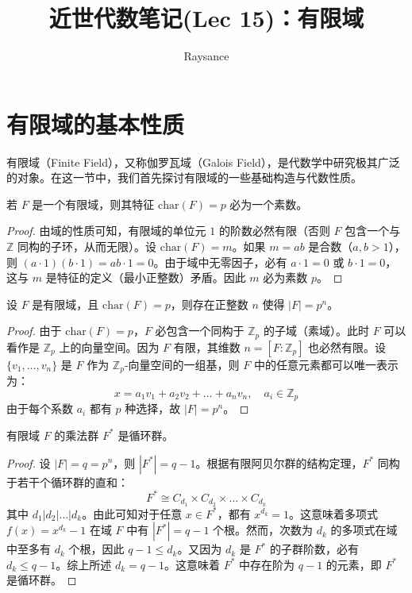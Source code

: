 \documentclass[11pt]{article}
\title{近世代数笔记(Lec 15)：有限域}
\author{Raysance}
\date{}
\begin{document}
\maketitle

\section{有限域的基本性质}

有限域（Finite Field），又称伽罗瓦域（Galois Field），是代数学中研究极其广泛的对象。在这一节中，我们首先探讨有限域的一些基础构造与代数性质。

\begin{cnproperty}
    若 $F$ 是一个有限域，则其特征 $\text{char}(F) = p$ 必为一个素数。
\end{cnproperty}
\begin{proof}
    由域的性质可知，有限域的单位元 $1$ 的阶数必然有限（否则 $F$ 包含一个与 $\mathbb{Z}$ 同构的子环，从而无限）。设 $\text{char}(F) = m$。如果 $m = ab$ 是合数（$a, b > 1$），则 $(a \cdot 1)(b \cdot 1) = ab \cdot 1 = 0$。由于域中无零因子，必有 $a \cdot 1 = 0$ 或 $b \cdot 1 = 0$，这与 $m$ 是特征的定义（最小正整数）矛盾。因此 $m$ 必为素数 $p$。
\end{proof}

\begin{cntheorem}
    设 $F$ 是有限域，且 $\text{char}(F) = p$，则存在正整数 $n$ 使得 $|F| = p^n$。
\end{cntheorem}
\begin{proof}
    由于 $\text{char}(F) = p$，$F$ 必包含一个同构于 $\mathbb{Z}_p$ 的子域（素域）。此时 $F$ 可以看作是 $\mathbb{Z}_p$ 上的向量空间。因为 $F$ 有限，其维数 $n = [F : \mathbb{Z}_p]$ 也必然有限。设 $\{v_1, \dots, v_n\}$ 是 $F$ 作为 $\mathbb{Z}_p$-向量空间的一组基，则 $F$ 中的任意元素都可以唯一表示为：
    \[ x = a_1 v_1 + a_2 v_2 + \dots + a_n v_n, \quad a_i \in \mathbb{Z}_p \]
    由于每个系数 $a_i$ 都有 $p$ 种选择，故 $|F| = p^n$。
\end{proof}

\begin{cntheorem}
    有限域 $F$ 的乘法群 $F^*$ 是循环群。
\end{cntheorem}
\begin{proof}
    设 $|F| = q = p^n$，则 $|F^*| = q-1$。根据有限阿贝尔群的结构定理，$F^*$ 同构于若干个循环群的直和：
    \[ F^* \cong C_{d_1} \times C_{d_2} \times \dots \times C_{d_k} \]
    其中 $d_1 | d_2 | \dots | d_k$。由此可知对于任意 $x \in F^*$，都有 $x^{d_k} = 1$。这意味着多项式 $f(x) = x^{d_k} - 1$ 在域 $F$ 中有 $|F^*| = q-1$ 个根。然而，次数为 $d_k$ 的多项式在域中至多有 $d_k$ 个根，因此 $q-1 \le d_k$。又因为 $d_k$ 是 $F^*$ 的子群阶数，必有 $d_k \le q-1$。综上所述 $d_k = q-1$。这意味着 $F^*$ 中存在阶为 $q-1$ 的元素，即 $F^*$ 是循环群。
\end{proof}
\end{document}
